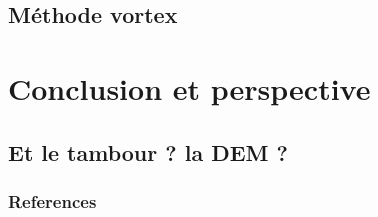 \documentclass[aspectratio=169]{beamer} %
\begin{document}
\subsection{Méthode vortex}

\section{Conclusion et perspective}
\subsection{Et le tambour ? la DEM ?}
\closingframe

\begin{frame}
    \frametitle{References}
    \printbibliography %
\end{frame}

\end{document}
